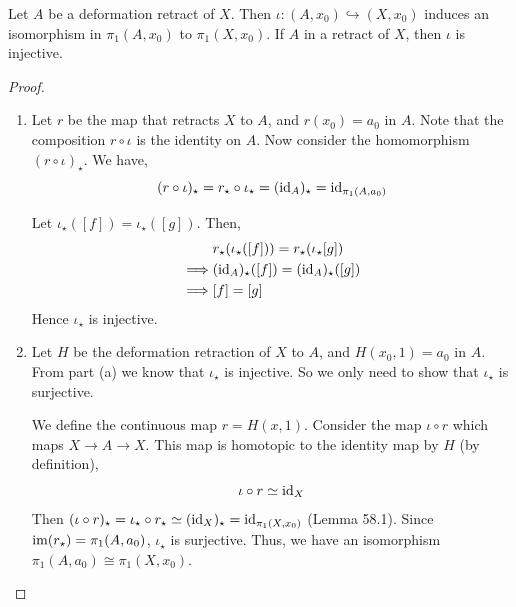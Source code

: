 \documentclass[12pt]{amsart}
\begin{document}
\begin{theorem}
    Let $A$ be a deformation retract of $X$. Then $\iota: (A, x_0) \hookrightarrow (X,x_0)$ induces an isomorphism in $\pi_1(A, x_0)$ to $\pi_1(X,x_0)$. If $A$ in a retract of $X$, then $\iota$ is injective. 
\end{theorem}

\begin{proof}
    \bbni
    \begin{enumerate}
        \item[(a)] Let $r$ be the map that retracts $X$ to $A$, and $r(x_0) = a_0$ in $A$. Note that the composition $r \circ \iota$ is the identity on $A$. Now consider the homomorphism $(r \circ \iota)_\star$. We have, 
        \[(r \circ \iota)_\star = r_\star \circ \iota_\star = (\operatorname{id}_A)_\star = \operatorname{id}_{\pi_1(A, a_0)}\]

        Let $\iota_\star([f]) = \iota_\star([g])$. Then,
        \begin{align*}
            &r_\star(\iota_\star([f])) = r_\star(\iota_\star[g]) \\ 
            \implies & (\operatorname{id}_A)_\star([f]) = (\operatorname{id}_A)_\star([g]) \\ 
            \implies & [f] = [g]
        \end{align*}
        Hence $\iota_\star$ is injective. 

        \item [(b)] Let $H$ be the deformation retraction of $X$ to $A$, and $H(x_0, 1) = a_0$ in $A$. From part (a) we know that $\iota_\star$ is injective. So we only need to show that $\iota_\star$ is surjective. 
        
        \noindent
        We define the continuous map $r = H(x, 1)$. Consider the map $\iota \circ r$ which maps $X \to A \to X$.  This map is homotopic to the identity map by $H$ (by definition),
        \[\iota \circ r \simeq \operatorname{id}_X\] 
        Then $(\iota \circ r)_\star = \iota_\star \circ r_\star \simeq (\operatorname{id}_X)_\star = \operatorname{id}_{\pi_1(X, x_0)}$ (Lemma 58.1). Since $\operatorname{im}(r_\star) = \pi_1(A, a_0)$, $\iota_\star$ is surjective.
        Thus, we have an isomorphism $\pi_1(A, a_0) \cong \pi_1(X, x_0)$. 
    \end{enumerate}
\end{proof}


\end{document}
